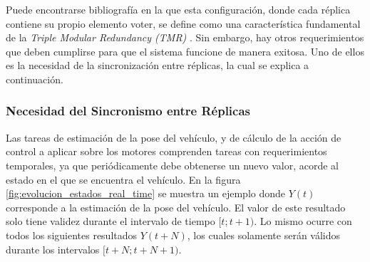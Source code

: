 Puede encontrarse bibliografía en la que esta configuración, donde cada réplica contiene su propio elemento voter, se define como una característica fundamental de la \textit{Triple Modular Redundancy (TMR)} \cite[p.~156]{kopetz-2011}. Sin embargo, hay otros requerimientos que deben cumplirse para que el sistema funcione de manera exitosa. Uno de ellos es la necesidad de la sincronización entre réplicas, la cual se explica a continuación.

\subsubsection{Necesidad del Sincronismo entre Réplicas}

Las tareas de estimación de la pose del vehículo, y de cálculo de la acción de control a aplicar sobre los motores comprenden tareas con requerimientos temporales, ya que periódicamente debe obtenerse un nuevo valor, acorde al estado en el que se encuentra el vehículo. En la figura \ref{fig:evolucion_estados_real_time} se muestra un ejemplo donde $Y(t)$ corresponde a la estimación de la pose del vehículo. El valor de este resultado solo tiene validez durante el intervalo de tiempo $[t;t+1)$. Lo mismo ocurre con todos los siguientes resultados $Y(t+N)$, los cuales solamente serán válidos durante los intervalos $[t+N;t+N+1)$.


